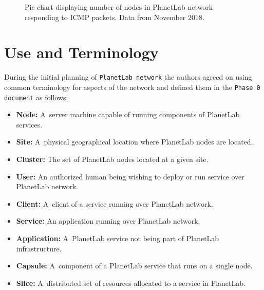\begin{figure}[H]
	\centering
	\caption{Pie chart displaying number of nodes in PlanetLab network responding to ICMP packets. Data from November 2018.}
	\label{fig:pingablepie}
\end{figure}

\section{Use and Terminology}
\label{section:terminology}
During the initial planning of \texttt{PlanetLab network} the authors agreed on using common terminology for aspects of the network and defined them in the \texttt{Phase 0 document} \cite{Roscoe_PDN-02-002} as follows:
\begin{itemize}
	\item \textbf{Node:} A~server machine capable of running components of PlanetLab services.
	\item \textbf{Site:} A~physical geographical location where PlanetLab nodes are located.
	\item \textbf{Cluster:} The set of PlanetLab nodes located at a given site.
	\item \textbf{User:} An authorized human being wishing to deploy or run service over PlanetLab network.
	\item \textbf{Client:} A~client of a service running over PlanetLab network.
	\item \textbf{Service:} An application running over PlanetLab network.
	\item \textbf{Application:} A~PlanetLab service not being part of PlanetLab infrastructure. 
	\item \textbf{Capsule:} A~component of a PlanetLab service that runs on a single node.
	\item \textbf{Slice:} A~distributed set of resources allocated to a service in PlanetLab.
\end{itemize}
